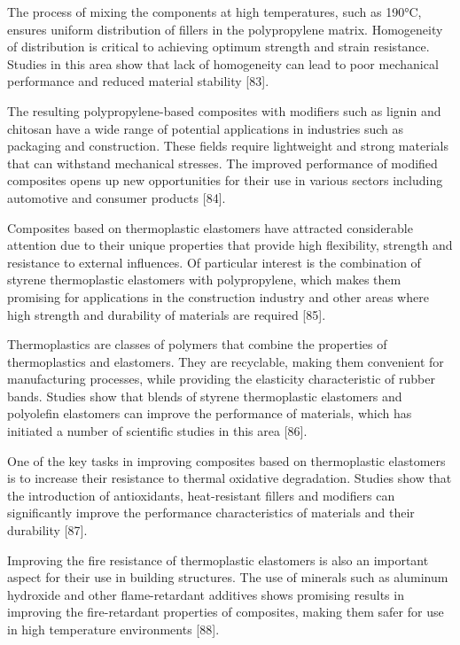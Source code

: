 \begin{multicols}{2}
The process of mixing the components at high temperatures, such as
190°C, ensures uniform distribution of fillers in the polypropylene
matrix. Homogeneity of distribution is critical to achieving optimum
strength and strain resistance. Studies in this area show that lack of
homogeneity can lead to poor mechanical performance and reduced material
stability {[}83{]}.

The resulting polypropylene-based composites with modifiers such as
lignin and chitosan have a wide range of potential applications in
industries such as packaging and construction. These fields require
lightweight and strong materials that can withstand mechanical stresses.
The improved performance of modified composites opens up new
opportunities for their use in various sectors including automotive and
consumer products {[}84{]}.

Composites based on thermoplastic elastomers have attracted considerable
attention due to their unique properties that provide high flexibility,
strength and resistance to external influences. Of particular interest
is the combination of styrene thermoplastic elastomers with
polypropylene, which makes them promising for applications in the
construction industry and other areas where high strength and durability
of materials are required {[}85{]}.

Thermoplastics are classes of polymers that combine the properties of
thermoplastics and elastomers. They are recyclable, making them
convenient for manufacturing processes, while providing the elasticity
characteristic of rubber bands. Studies show that blends of styrene
thermoplastic elastomers and polyolefin elastomers can improve the
performance of materials, which has initiated a number of scientific
studies in this area {[}86{]}.

One of the key tasks in improving composites based on thermoplastic
elastomers is to increase their resistance to thermal oxidative
degradation. Studies show that the introduction of antioxidants,
heat-resistant fillers and modifiers can significantly improve the
performance characteristics of materials and their durability {[}87{]}.

Improving the fire resistance of thermoplastic elastomers is also an
important aspect for their use in building structures. The use of
minerals such as aluminum hydroxide and other flame-retardant additives
shows promising results in improving the fire-retardant properties of
composites, making them safer for use in high temperature environments
{[}88{]}.


\end{multicols}
